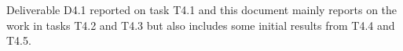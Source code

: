 Deliverable D4.1 reported on task T4.1 and this document mainly
reports on the work in tasks T4.2 and T4.3 but also includes some
initial results from T4.4 and T4.5.


